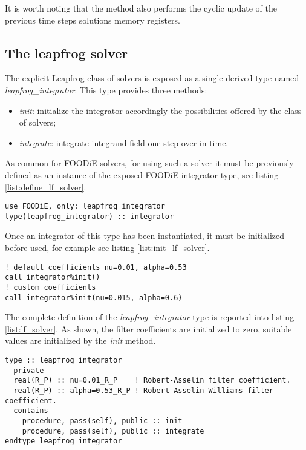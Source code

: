 \documentclass[pdftex,preprint,3p,times,numbers]{elsarticle}
\begin{document}
It is worth noting that the method also performs the cyclic update of the previous time steps solutions memory registers.

\subsection{The leapfrog solver}\label{subsec:solver_leapfrog}

The explicit Leapfrog class of solvers is exposed as a single derived type named \emph{leapfrog\_integrator}. This type provides three methods:

\begin{itemize}
  \item \emph{init}: initialize the integrator accordingly the possibilities offered by the class of solvers;
  \item \emph{integrate}: integrate integrand field one-step-over in time.
  \end{itemize}

As common for FOODiE solvers, for using such a solver it must be previously defined as an instance of the exposed FOODiE integrator type, see listing \ref{list:define_lf_solver}.

\begin{lstlisting}[firstnumber=1,style=code,caption={definition of an explicit Leapfrog integrator},label={list:define_lf_solver}]
use FOODiE, only: leapfrog_integrator
type(leapfrog_integrator) :: integrator
\end{lstlisting}

Once an integrator of this type has been instantiated, it must be initialized before used, for example see listing \ref{list:init_lf_solver}.

\begin{lstlisting}[firstnumber=1,style=code,caption={example of initialization of an explicit Leapfrog integrator},label={list:init_lf_solver}]
! default coefficients nu=0.01, alpha=0.53
call integrator%init()
! custom coefficients
call integrator%init(nu=0.015, alpha=0.6)
\end{lstlisting}

The complete definition of the \emph{leapfrog\_integrator} type is reported into listing \ref{list:lf_solver}. As shown, the filter coefficients are initialized to zero, suitable values are initialized by the \emph{init} method.

\begin{lstlisting}[firstnumber=1,style=code,caption={definition of \emph{leapfrog\_integrator} type},label={list:lf_solver}]
type :: leapfrog_integrator
  private
  real(R_P) :: nu=0.01_R_P    ! Robert-Asselin filter coefficient.
  real(R_P) :: alpha=0.53_R_P ! Robert-Asselin-Williams filter coefficient.
  contains
    procedure, pass(self), public :: init
    procedure, pass(self), public :: integrate
endtype leapfrog_integrator
\end{lstlisting}
\end{document}
